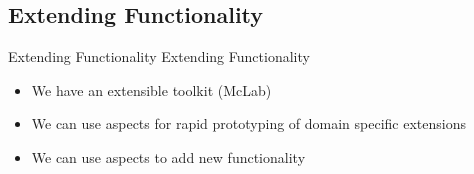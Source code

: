 

\subsection*{Extending Functionality}
\begin{frame}{Extending Functionality}
  Extending Functionality
  \begin{itemize}
  \item We have an extensible toolkit (McLab)
  \item We can use aspects for rapid prototyping of domain specific extensions
  \item We can use aspects to add new functionality %
  \end{itemize}
\end{frame}

